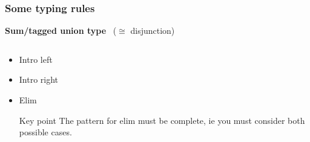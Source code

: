 \documentclass{beamer}
\begin{document}
\begin{frame}
\begin{columns}
  \end{columns}
  
\end{frame}


\begin{frame}
  \frametitle{Some typing rules}
  
  \qquad \qquad \quad \textbf{Sum/tagged union type} \, ($\cong$ disjunction)
  \begin{columns}
    \begin{column}{.7\textwidth}
      \vspace{0.05\textheight}
      \begin{itemize}[label=$\ast$]
      \item
        Intro left
        \begin{prooftree}
        \end{prooftree}

      \item
        Intro right
        \begin{prooftree}
        \end{prooftree}

      \item
        Elim \\
        \begin{prooftree}
        \end{prooftree}
        \begin{block} {Key point}
          The pattern for elim must be \alert{complete}, ie you must consider
          both possible cases.
        \end{block}
      \end{itemize}
    \end{column}
  \end{columns}
\end{frame}
\end{document}
